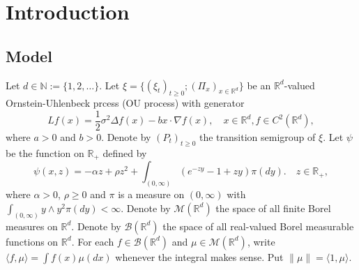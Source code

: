 \documentclass[12pt,a4paper]{amsart}
\theoremstyle{plain}
\theoremstyle{definition}
\numberwithin{equation}{section}
\begin{document}
\maketitle
\section{Introduction}
\subsection{Model}
\label{ss:1.1}
	Let $d \in \mathbb N:= \{1,2,\dots\}$. 
    Let $\xi=\{(\xi_t)_{t\geq 0}; (\Pi_x)_{x\in \mathbb R^d}\}$ be an $\mathbb R^d$-valued Ornstein-Uhlenbeck prcess (OU process) with generator
\begin{equation}
\label{eq: OU generator}
    Lf(x)
        = \frac{1}{2}\sigma^2\Delta f(x)-b x \cdot \nabla f(x),
        \quad  x\in \mathbb R^d,
        f \in C^2(\mathbb R^d),
\end{equation}
    where $a>0$ and $b>0$.
    Denote by $(P_t)_{t\geq 0}$ the transition semigroup of $\xi$.
    Let $\psi$ be the function on $\mathbb R_+$ defined by
\begin{equation}
\label{mechanism}
    \psi(x,z)=
    - \alpha z + \rho z^2 + \int_{(0,\infty)} (e^{-zy} - 1 + zy) \pi(dy).
    \quad  z \in \mathbb R_+,
\end{equation}
	where $\alpha > 0 $, $\rho \geq0$ and $\pi$ is a measure on $(0,\infty)$ with $\int_{(0,\infty)}y\wedge y^2 \pi(dy)< \infty$.
    Denote by $\mathcal M(\mathbb R^d)$ the space of all finite Borel measures on $\mathbb R^d$.
    Denote by $\mathcal B(\mathbb R^d)$ the space of all real-valued Borel measurable functions on $\mathbb R^d$.
	For each $f\in \mathcal B(\mathbb R^d)$ and $\mu \in \mathcal M(\mathbb R^d)$, write $\langle f,\mu\rangle = \int f(x)\mu(dx)$ whenever the integral makes sense.
    Put $\|\mu\|=\langle 1,\mu\rangle$.
 
\end{document}
